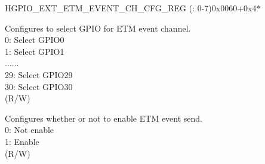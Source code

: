 \begin{register}{H}{GPIO\_EXT\_ETM\_EVENT\_CH\_CFG\_REG (: 0-7)}{0x0060+0x4*}\label{regdesc:GPIOSDETMEVENTCHNCFGREG}
%
%
%
%
\regnewline%
\begin{regdesc}\begin{reglist}
\label{fielddesc:GPIOSDETMCH0EVENTSEL}\item [GPIO\_EXT\_ETM\_CH\regindex{n}\_EVENT\_SEL] Configures to select GPIO for ETM event channel.\\
0: Select GPIO0\\
1: Select GPIO1\\
......\\
29: Select GPIO29\\
30: Select GPIO30\\ (R/W)
\label{fielddesc:GPIOSDETMCH0EVENTEN}\item [GPIO\_EXT\_ETM\_CH\regindex{n}\_EVENT\_EN] Configures whether or not to enable ETM event send.\\
0: Not enable\\
1: Enable\\(R/W)
\end{reglist}\end{regdesc}
\end{register}


